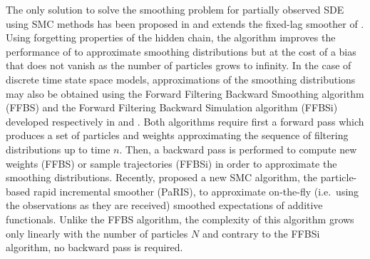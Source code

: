 \documentclass[12pt]{article}
\newcommand{\1}{\mathrm{1}}
\begin{document}
 The only solution to solve the smoothing problem for partially observed SDE using SMC methods has been proposed in \cite{olsson:strojby:2011} and extends the fixed-lag smoother of \cite{olsson:cappe:douc:moulines:2008}. 
 Using forgetting properties of the hidden chain, the algorithm improves the performance of \cite{fearnhead:papaspiliopoulos:roberts:2008} to approximate smoothing distributions but at the cost of a bias that does not vanish as the number of particles grows to infinity.
In the case of discrete time state space models, approximations of the smoothing distributions may also be obtained using the Forward Filtering Backward Smoothing algorithm (FFBS) and  the Forward Filtering Backward Simulation algorithm (FFBSi) developed respectively in \cite{kitagawa:1996,huerzeler:kunsch:1998,doucet:godsill:andrieu:2000} and \cite{godsill:doucet:west:2004}. 
Both algorithms require first a forward pass which produces a set of particles and weights approximating the sequence of filtering distributions up to time $n$. Then, a backward pass is performed to compute new weights (FFBS) or sample trajectories (FFBSi) in order to approximate the smoothing distributions. 
Recently, \cite{olsson:westerborn:2016} proposed a new SMC algorithm, the particle-based rapid incremental smoother (PaRIS), to approximate on-the-fly (i.e.\ using the observations as they are received) smoothed expectations of additive functionals. 
Unlike the FFBS algorithm, the complexity of this algorithm grows only linearly with the number of particles $N$ and contrary to the FFBSi algorithm, no backward pass is required. 
\end{document}
